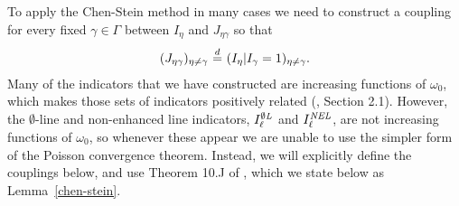 To apply the Chen-Stein method in many cases we need to construct a coupling for every fixed $\gamma \in \Gamma$ between $I_\eta$ and $J_{\eta\gamma}$ so that
\begin{align}
\label{coupling}
(J_{\eta\gamma})_{\eta\neq \gamma} \deq (I_\eta | I_\gamma=1)_{\eta\neq\gamma}.
\end{align}
Many of the indicators that we have constructed are increasing functions of $\omega_0$, which makes those sets of indicators positively related (\cite{poissonbook}, Section 2.1).  However, the $\emptyset$-line and non-enhanced line indicators, $I^{\emptyset\text{\em L}}_\ell$ and $I^{\text{\em NEL}}_\ell$, are not increasing functions of $\omega_0$, so whenever these appear we are unable to use the simpler form of the Poisson convergence theorem.  Instead, we will explicitly define the couplings below, and use Theorem 10.J of \cite{poissonbook}, which we state below as Lemma~\ref{chen-stein}.

